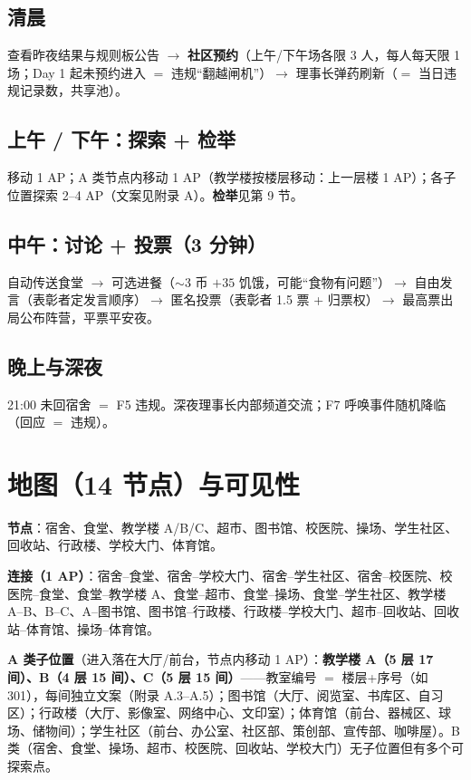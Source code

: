 \documentclass[UTF8, fontset=none, 11pt]{ctexart}
\begin{document}
\subsection{清晨}
查看昨夜结果与规则板公告 $\to$ \textbf{社区预约}（上午/下午场各限 3 人，每人每天限 1 场；Day 1 起未预约进入 $=$ 违规``翻越闸机''）$\to$ 理事长弹药刷新（$=$ 当日违规记录数，共享池）。

\subsection{上午 / 下午：探索 + 检举}
移动 1 AP；A 类节点内移动 1 AP（教学楼按楼层移动：上一层楼 1 AP）；各子位置探索 2--4 AP（文案见附录 A）。\textbf{检举}见第 9 节。

\subsection{中午：讨论 + 投票（3 分钟）}
自动传送食堂 $\to$ 可选进餐（$\sim$3 币 $+35$ 饥饿，可能``食物有问题''）$\to$ 自由发言（表彰者定发言顺序）$\to$ 匿名投票（表彰者 1.5 票 + 归票权）$\to$ 最高票出局公布阵营，平票平安夜。

\subsection{晚上与深夜}
21:00 未回宿舍 $=$ F5 违规。深夜理事长内部频道交流；F7 呼唤事件随机降临（回应 $=$ 违规）。

\section{地图（14 节点）与可见性}
\textbf{节点}：宿舍、食堂、教学楼 A/B/C、超市、图书馆、校医院、操场、学生社区、回收站、行政楼、学校大门、体育馆。

\textbf{连接（1 AP）}：宿舍--食堂、宿舍--学校大门、宿舍--学生社区、宿舍--校医院、校医院--食堂、食堂--教学楼 A、食堂--超市、食堂--操场、食堂--学生社区、教学楼 A--B、B--C、A--图书馆、图书馆--行政楼、行政楼--学校大门、超市--回收站、回收站--体育馆、操场--体育馆。

\textbf{A 类子位置}（进入落在大厅/前台，节点内移动 1 AP）：\textbf{教学楼 A（5 层 17 间）、B（4 层 15 间）、C（5 层 15 间）}——教室编号 $=$ 楼层+序号（如 301），每间独立文案（附录 A.3--A.5）；图书馆（大厅、阅览室、书库区、自习区）；行政楼（大厅、影像室、网络中心、文印室）；体育馆（前台、器械区、球场、储物间）；学生社区（前台、办公室、社区部、策创部、宣传部、咖啡屋）。B 类（宿舍、食堂、操场、超市、校医院、回收站、学校大门）无子位置但有多个可探索点。
\end{document}
